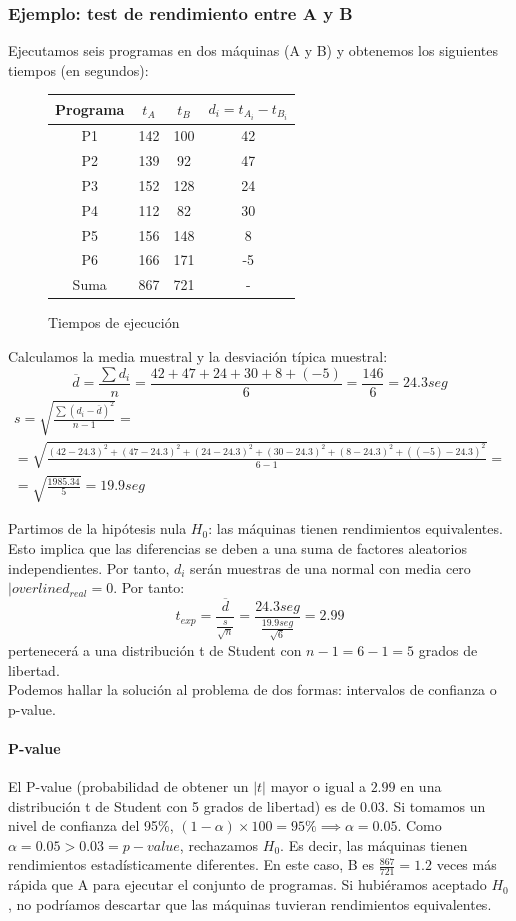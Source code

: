 \documentclass[12pt,spanish]{article}
\begin{document}
\subsubsection{Ejemplo: test de rendimiento entre A y B}
Ejecutamos seis programas en dos máquinas (A y B) y obtenemos los siguientes tiempos (en segundos):
\begin{figure}[H]
	\centering
	\begin{tabular}{|c|c|c|c|}
		\hline
		Programa & $t_A$ & $t_B$ & $d_i=t_{A_i}-t_{B_i}$\\
		\hline
		P1 & 142 & 100 & 42 \\
		\hline
		P2 & 139 & 92 & 47 \\
		\hline
		P3 & 152 & 128 & 24\\
		\hline
		P4 & 112 & 82 & 30\\
		\hline
		P5 & 156 & 148 & 8\\
		\hline
		P6 & 166 & 171 & -5\\
		\hline
		Suma & 867 & 721 & -\\
		\hline
	\end{tabular}
	\caption{Tiempos de ejecución}
\end{figure}
Calculamos la media muestral y la desviación típica muestral:
\begin{equation*}
	\overline{d}=\frac{\sum{d_i}}{n}=\frac{42+47+24+30+8+(-5)}{6}=\frac{146}{6}=24.3 seg
\end{equation*}
\begin{gather*}
		s=\sqrt{\frac{\sum{(d_i-\overline{d})^2}
		}{n-1}}=\\
		=\sqrt{\frac{(42-24.3)^2+(47-24.3)^2+(24-24.3)^2+(30-24.3)^2+(8-24.3)^2+((-5)-24.3)^2}{6-1}} =\\ = \sqrt{\frac{1985.34}{5}}=19.9 seg
\end{gather*}

Partimos de la hipótesis nula $H_0$: las máquinas tienen rendimientos equivalentes. Esto implica que las diferencias se deben a una suma de factores aleatorios independientes. Por tanto, $d_i$ serán muestras de una normal con media cero $|overline{d_{real}}=0$. Por tanto:
\begin{equation*}
	t_{exp}=\frac{\overline{d}}{\frac{s}{\sqrt{n}}}=\frac{24.3 seg}{\frac{19.9 seg}{\sqrt{6}}}=2.99
\end{equation*}
pertenecerá a una distribución t de Student con $n-1=6-1=5$ grados de libertad.\\
Podemos hallar la solución al problema de dos formas: intervalos de confianza o p-value.
\paragraph{P-value}
El P-value (probabilidad de obtener un $|t|$ mayor o igual a $2.99$ en una distribución t de Student con 5 grados de libertad) es de $0.03$. Si tomamos un nivel de confianza del 95\%, $(1-\alpha) \times 100 = 95\% \implies \alpha=0.05$. Como $\alpha=0.05 > 0.03 = p-value$, rechazamos $H_0$. Es decir, las máquinas tienen rendimientos estadísticamente diferentes. En este caso, B es $\frac{867}{721}=1.2$ veces más rápida que A para ejecutar el conjunto de programas. Si hubiéramos aceptado $H_0$, no podríamos descartar que las máquinas tuvieran rendimientos equivalentes.
\end{document}
